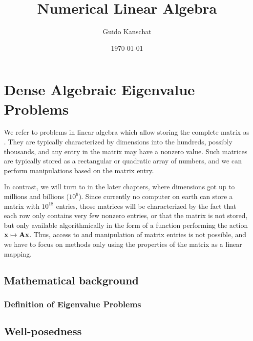 \lstset{language=Python,numbers=left,resetmargins=true,xleftmargin=8pt,basicstyle=\small,numberstyle=\scriptsize}
\usetikzlibrary{svg.path}


\title{Numerical Linear Algebra}
\author{Guido Kanschat}
\date{\today}

\def\esp#1{V_{#1}}


\maketitle
\tableofcontents
\chapter{Dense Algebraic Eigenvalue Problems}
\begin{intro}
  We refer to problems in linear algebra which allow storing the
  complete matrix as . They are typically
  characterized by dimensions into the hundreds, possibly thousands,
  and any entry in the matrix may have a nonzero value. Such matrices
  are typically stored as a rectangular or quadratic array of numbers,
  and we can perform manipulations based on the matrix entry.

  In contrast, we will turn to  in the
  later chapters, where dimensions got up to millions and billions
  ($10^9$). Since currently no computer on earth can store a matrix
  with $10^{18}$ entries, those matrices will be characterized by the
  fact that each row only contains very few nonzero entries, or that
  the matrix is not stored, but only available algorithmically in the
  form of a function performing the action $\mathbf x\mapsto \mathbf A
  \mathbf x$. Thus, access to and manipulation of matrix entries is not
  possible, and we have to focus on methods only using the properties
  of the matrix as a linear mapping.
\end{intro}

\section{Mathematical background}
\subsection{Definition of Eigenvalue Problems}

\section{Well-posedness}


